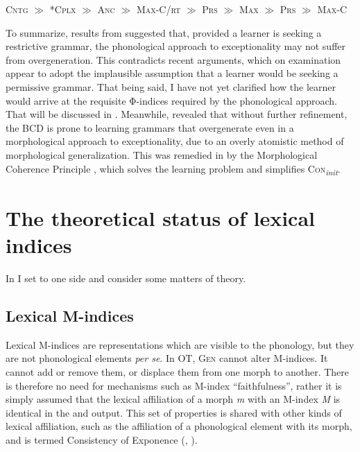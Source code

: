 \documentclass[output=paper,
modfonts
]{LSP/langsci}
\begin{document}
\ea \label{ex:round:44}
\textsc{Cntg} \textsc{${\gg}$}\textsc{} \textsc{*Cplx} \textsc{${\gg}$} \textsc{Anc} \textsc{${\gg}$} \textsc{Max-C/rt} \textsc{${\gg}$}\textsc{} \textsc{Prs}\textit{} ${\gg}$ \textsc{Max} \textsc{${\gg}$}\textsc{} \textsc{Prs} \textsc{${\gg}$} \textsc{Max-C}
\z

To summarize, results from  suggested that, provided a learner is seeking a restrictive grammar, the phonological approach to exceptionality may not suffer from overgeneration. This contradicts recent arguments, which on examination appear to adopt the implausible assumption that a learner would be seeking a permissive grammar. That being said, I have not yet clarified how the learner would arrive at the requisite Φ-indices required by the phonological approach. That will be discussed in . Meanwhile,  revealed that without further refinement, the BCD is prone to learning grammars that overgenerate even in a morphological approach to exceptionality, due to an overly atomistic method of morphological generalization. This was remedied in  by the Morphological Coherence Principle , which solves the learning problem and simplifies \textsc{Con}\textit{\textsubscript{init}}.

\section[The theoretical status of lexical indices]{The theoretical status of lexical indices}\label{sec:round:7}
In  I set  to one side and consider some matters of theory.
\label{bkm:Ref335653889}\subsection[Lexical M{}-indices]{Lexical M-indices}\label{sec:round:7.1}
\label{bkm:Ref335571912}

Lexical M-indices are representations which are visible to the phonology, but they are not phonological elements \textit{per se}. In OT, \textsc{Gen} cannot alter M-indices. It cannot add or remove them, or displace them from one morph to another. There is therefore no need for mechanisms such as M-index ``faithfulness'', rather it is simply assumed that the lexical affiliation of a morph \textit{m} with an M-index \textit{M} is identical in the  and output. This set of properties is shared with other kinds of lexical affiliation, such as the affiliation of a phonological element with its morph, and is termed Consistency of Exponence (\citealt{mccarthy1993a}, \citealt{vanderived2007}).
\end{document}
